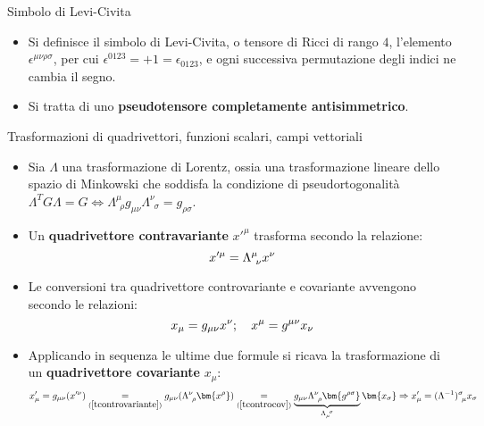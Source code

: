 \documentclass[a4_2,grid,frame]{flashcards}
\newenvironment{cartaflash}
    {\vspace{-15pt}
    \begin{itemize}
    }
    {
    \end{itemize}
    }
\begin{document}
\begin{flashcard}[Definizione]{Simbolo di Levi-Civita}
\begin{cartaflash}
\item Si definisce il simbolo di Levi-Civita, o tensore di Ricci di rango $4$, l'elemento $\epsilon^{\mu\nu\rho\sigma}$, per cui $\epsilon^{0123} = +1 = \epsilon_{0123}$, e ogni successiva permutazione degli indici ne cambia il segno. 
\item Si tratta di uno \textbf{pseudotensore completamente antisimmetrico}. 
\end{cartaflash}
\end{flashcard}

\begin{flashcard}[Trasformazioni]{Trasformazioni di quadrivettori, funzioni scalari, campi vettoriali}
\begin{cartaflash}
\item Sia $\Lambda$ una trasformazione di Lorentz, ossia una trasformazione lineare dello spazio di Minkowski che soddisfa la condizione di pseudortogonalità $\Lambda^T G \Lambda = G \Leftrightarrow \Lambda^\mu_{\>\>\rho} g_{\mu\nu} \Lambda^\nu_{\>\>\sigma} = g_{\rho\sigma}$.
\vspace{-20pt}
\item Un \textbf{quadrivettore contravariante} $x'^\mu$ trasforma secondo la relazione:
\vspace{-8pt}
\begin{equation}
    x'^\mu = \Lambda^\mu_{\>\>\nu} x^\nu
    \label{tcontrovariante}
\vspace{-13pt}
\end{equation}
\item Le conversioni tra quadrivettore controvariante e covariante avvengono secondo le relazioni:
\vspace{-8pt}
\begin{equation}
    x_\mu = g_{\mu\nu}x^\nu; \quad x^\mu = g^{\mu\nu}x_\nu
    \label{tcontrocov}
\vspace{-8pt}
\end{equation}
\item Applicando in sequenza le ultime due formule si ricava la trasformazione di un \textbf{quadrivettore covariante} $x_\mu$:
\vspace{-8pt}
\[
x'_\mu = g_{\mu\nu}(x'^\nu) \underset{(\ref{tcontrovariante})}{=} g_{\mu\nu}(\Lambda^\nu_{\>\>\rho} \bm{x^\rho}) \underset{(\ref{tcontrocov})}{=} \underbrace{g_{\mu\nu}\Lambda^\nu_{\>\>\rho} \bm{g^{\rho\sigma}}}_{\Lambda_\mu^{\>\>\sigma}} \bm{x_\sigma} \Rightarrow x'_\mu = (\Lambda^{-1})^\sigma_{\>\>\mu} x_\sigma
\]
\end{cartaflash}
\end{flashcard}
\end{document}
